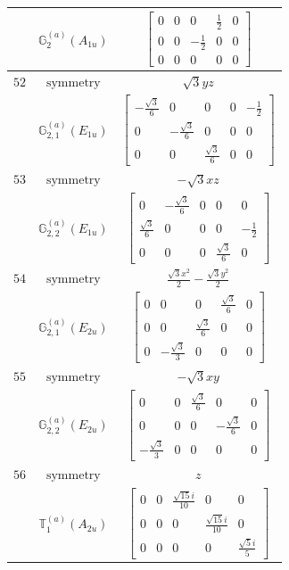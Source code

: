 \documentclass[fleqn,8pt,landscape]{jsarticle}
\begin{document}
\begin{longtable}{ccc}
$  $ & $ \mathbb{G}_{2}^{(a)}(A_{1u}) $ & $ \begin{bmatrix} 0 & 0 & 0 & \frac{1}{2} & 0 \\ 0 & 0 & - \frac{1}{2} & 0 & 0 \\ 0 & 0 & 0 & 0 & 0 \end{bmatrix} $ \\ \hline
$ 52 $ & $ \text{symmetry} $ & $ \sqrt{3} y z $ \\
$  $ & $ \mathbb{G}_{2,1}^{(a)}(E_{1u}) $ & $ \begin{bmatrix} - \frac{\sqrt{3}}{6} & 0 & 0 & 0 & - \frac{1}{2} \\ 0 & - \frac{\sqrt{3}}{6} & 0 & 0 & 0 \\ 0 & 0 & \frac{\sqrt{3}}{6} & 0 & 0 \end{bmatrix} $ \\ \hline
$ 53 $ & $ \text{symmetry} $ & $ - \sqrt{3} x z $ \\
$  $ & $ \mathbb{G}_{2,2}^{(a)}(E_{1u}) $ & $ \begin{bmatrix} 0 & - \frac{\sqrt{3}}{6} & 0 & 0 & 0 \\ \frac{\sqrt{3}}{6} & 0 & 0 & 0 & - \frac{1}{2} \\ 0 & 0 & 0 & \frac{\sqrt{3}}{6} & 0 \end{bmatrix} $ \\ \hline
$ 54 $ & $ \text{symmetry} $ & $ \frac{\sqrt{3} x^{2}}{2} - \frac{\sqrt{3} y^{2}}{2} $ \\
$  $ & $ \mathbb{G}_{2,1}^{(a)}(E_{2u}) $ & $ \begin{bmatrix} 0 & 0 & 0 & \frac{\sqrt{3}}{6} & 0 \\ 0 & 0 & \frac{\sqrt{3}}{6} & 0 & 0 \\ 0 & - \frac{\sqrt{3}}{3} & 0 & 0 & 0 \end{bmatrix} $ \\ \hline
$ 55 $ & $ \text{symmetry} $ & $ - \sqrt{3} x y $ \\
$  $ & $ \mathbb{G}_{2,2}^{(a)}(E_{2u}) $ & $ \begin{bmatrix} 0 & 0 & \frac{\sqrt{3}}{6} & 0 & 0 \\ 0 & 0 & 0 & - \frac{\sqrt{3}}{6} & 0 \\ - \frac{\sqrt{3}}{3} & 0 & 0 & 0 & 0 \end{bmatrix} $ \\ \hline
$ 56 $ & $ \text{symmetry} $ & $ z $ \\
$  $ & $ \mathbb{T}_{1}^{(a)}(A_{2u}) $ & $ \begin{bmatrix} 0 & 0 & \frac{\sqrt{15} i}{10} & 0 & 0 \\ 0 & 0 & 0 & \frac{\sqrt{15} i}{10} & 0 \\ 0 & 0 & 0 & 0 & \frac{\sqrt{5} i}{5} \end{bmatrix} $ \\ \hline

\end{longtable}
\end{document}
